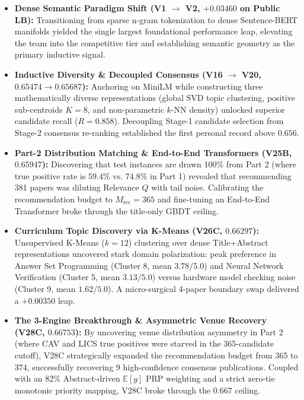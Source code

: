 \begin{prismbox}[title=\textbf{Performance Evolution Analysis}]

\begin{itemize}

  \item \textbf{Dense Semantic Paradigm Shift (V1 $\to$ V2, $+0.03460$ on Public LB):} Transitioning from sparse n-gram tokenization to dense Sentence-BERT manifolds yielded the single largest foundational performance leap, elevating the team into the competitive tier and establishing semantic geometry as the primary inductive signal.

  \item \textbf{Inductive Diversity \& Decoupled Consensus (V16 $\to$ V20, $0.65474 \to 0.65687$):} Anchoring on MiniLM while constructing three mathematically diverse representations (global SVD topic clustering, positive sub-centroids $K=8$, and non-parametric $k$-NN density) unlocked superior candidate recall ($R = 0.858$). Decoupling Stage-1 candidate selection from Stage-2 consensus re-ranking established the first personal record above $0.656$.

  \item \textbf{Part-2 Distribution Matching \& End-to-End Transformers (V25B, $0.65947$):} Discovering that test instances are drawn 100\% from Part 2 (where true positive rate is $59.4\%$ vs. $74.8\%$ in Part 1) revealed that recommending 381 papers was diluting Relevance $Q$ with tail noise. Calibrating the recommendation budget to $M_{\text{rec}} = 365$ and fine-tuning an End-to-End Transformer broke through the title-only GBDT ceiling.

  \item \textbf{Curriculum Topic Discovery via K-Means (V26C, $0.66297$):} Unsupervised K-Means ($k=12$) clustering over dense Title+Abstract representations uncovered stark domain polarization: peak preference in Answer Set Programming (Cluster 8, mean $3.78/5.0$) and Neural Network Verification (Cluster 5, mean $3.13/5.0$) versus hardware model checking noise (Cluster 9, mean $1.62/5.0$). A micro-surgical 4-paper boundary swap delivered a $+0.00350$ leap.

  \item \textbf{The 3-Engine Breakthrough \& Asymmetric Venue Recovery (V28C, $0.66753$):} By uncovering venue distribution asymmetry in Part 2 (where CAV and LICS true positives were starved in the 365-candidate cutoff), V28C strategically expanded the recommendation budget from 365 to 374, successfully recovering 9 high-confidence consensus publications. Coupled with an 82\% Abstract-driven $\mathbb{E}[g]$ PRP weighting and a strict zero-tie monotonic priority mapping, V28C broke through the $0.667$ ceiling.


\end{itemize}
\end{prismbox}
